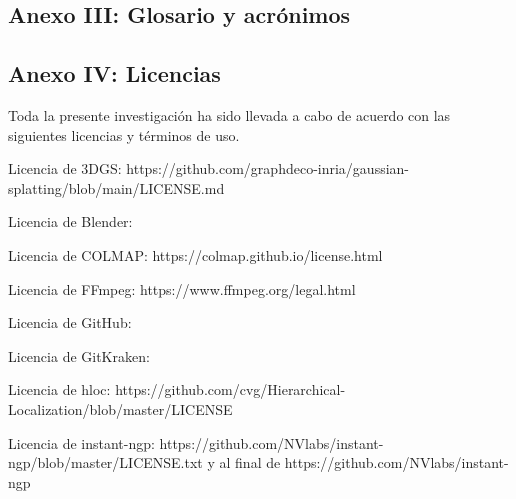 \documentclass[a4paper, 12pt, spanish, twoside]{article}
\begin{document}

\newpage
\subsection{Anexo III: Glosario y acrónimos} \label{sec:anexo3}

\glsaddall


\printglossary[title=Glosario, toctitle=Glosario]

\newpage
\printglossary[type=\acronymtype, title={Abreviaturas, unidades y acrónimos}, toctitle={Abreviaturas, unidades y acrónimos}]


\clearpage




\newpage
\subsection{Anexo IV: Licencias} \label{sec:anexo4}

Toda la presente investigación ha sido llevada a cabo de acuerdo con las siguientes licencias y términos de uso.

Licencia de 3DGS: https://github.com/graphdeco-inria/gaussian-splatting/blob/main/LICENSE.md

Licencia de Blender: 

Licencia de COLMAP: https://colmap.github.io/license.html

Licencia de FFmpeg: https://www.ffmpeg.org/legal.html

Licencia de GitHub: 

Licencia de GitKraken: 

Licencia de hloc: https://github.com/cvg/Hierarchical-Localization/blob/master/LICENSE

Licencia de instant-ngp: https://github.com/NVlabs/instant-ngp/blob/master/LICENSE.txt y al final de https://github.com/NVlabs/instant-ngp
\end{document}
